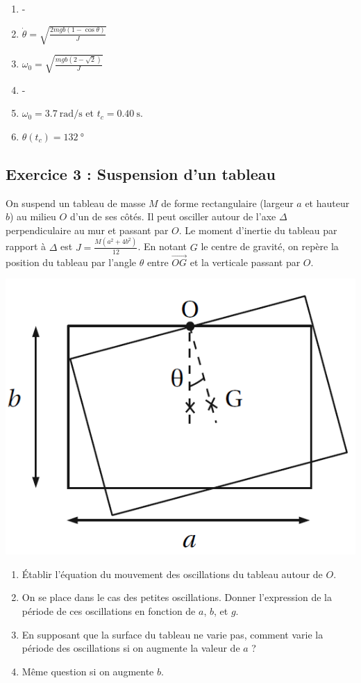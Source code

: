 \begin{enumerate}
	\item -
	\item $\dot{\theta} = \sqrt{\frac{2mgb(1-\cos\theta)}{J}}$
	\item $\omega_0 = \sqrt{\frac{mgb(2-\sqrt{2})}{J}}$
	\item -
	\item $\omega_0 = \SI{3.7}{\radian\per\second}$ et $t_c = \SI{0.40}{\second}$.
	\item $\theta(t_c) = \SI{132}{\degree}$
\end{enumerate}

\subsection{Exercice 3 : Suspension d'un tableau}

On suspend un tableau de masse $M$ de forme rectangulaire (largeur $a$ et hauteur $b$) au milieu $O$ d'un de ses côtés. Il peut osciller autour de l'axe $\Delta$ perpendiculaire au mur et passant par $O$. Le moment d'inertie du tableau par rapport à $\Delta$ est $J = \frac{M(a^2 + 4 b^2)}{12}$. En notant $G$ le centre de gravité, on repère la position du tableau par l'angle $\theta$ entre $\overrightarrow{OG}$ et la verticale passant par $O$.

\begin{center}
	\includegraphics[width=.5\textwidth]{Images/mpsi_s26_ex03.png}
\end{center}

\begin{enumerate}
	\item Établir l'équation du mouvement des oscillations du tableau autour de $O$.
	\item On se place dans le cas des petites oscillations. Donner l'expression de la période de ces oscillations en fonction de $a$, $b$, et $g$.
	\item En supposant que la surface du tableau ne varie pas, comment varie la période des oscillations si on augmente la valeur de $a$ ?
	\item Même question si on augmente $b$.
\end{enumerate}
